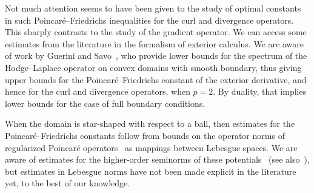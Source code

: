 \documentclass[10pt,letterpaper]{article}
\begin{document}
Not much attention seems to have been given to the study of optimal constants in such Poincar\'e--Friedrichs inequalities for the curl and divergence operators. 
This sharply contrasts to the study of the gradient operator. 
%
We can access some estimates from the literature in the formalism of exterior calculus. 
We are aware of work by Guerini and Savo~\cite{guerini2004eigenvalue},
who provide lower bounds for the spectrum of the Hodge--Laplace operator on convex domains with smooth boundary, %
thus giving upper bounds for the Poincar\'e--Friedrichs constant of the exterior derivative, and hence for the curl and divergence operators, when $p=2$.
By duality, that implies lower bounds for the case of full boundary conditions.

When the domain is star-shaped with respect to a ball, then estimates for the Poincar\'e--Friedrichs constants 
follow from bounds on the operator norms of regularized Poincar\'e operators~\cite{costabel2010bogovskiui}
as mappings between Lebesgue spaces. 
We are aware of estimates for the higher-order seminorms of these potentials~\cite{guzman2021estimation} (see also~\cite{gallistl2023computational}),
but estimates in Lebesgue norms have not been made explicit in the literature yet, to the best of our knowledge.
\\
\end{document}
